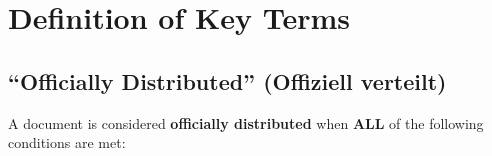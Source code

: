 \documentclass[11pt,a4paper]{article}
\begin{document}
\section{Definition of Key Terms}

\subsection{``Officially Distributed'' (Offiziell verteilt)}

\begin{successbox}
A document is considered \textbf{officially distributed} when \textbf{ALL} of the following conditions are met:
\end{successbox}
\end{document}
